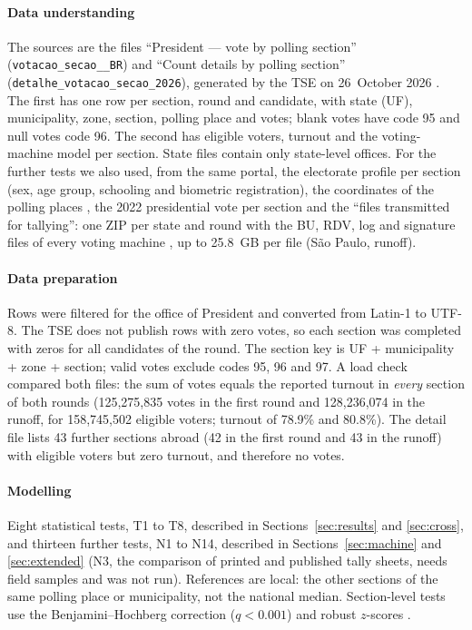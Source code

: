 \documentclass[fleqn,10pt]{SelfArx}
\begin{document}
\paragraph{Data understanding} The sources are the files ``President ---
vote by polling section'' (\texttt{votacao\_secao\_\_BR}) and ``Count
details by polling section'' (\texttt{detalhe\_votacao\_\allowbreak secao\_2026}),
generated by the TSE on 26~October 2026 \cite{tse2026}. The first has one
row per section, round and candidate, with state (UF), municipality, zone,
section, polling place and votes; blank votes have code 95 and null votes
code 96. The second has eligible voters, turnout and the voting-machine
model per section. State files contain only state-level offices. For the
further tests we also used, from the same portal, the electorate profile per
section (sex, age group, schooling and biometric registration), the
coordinates of the polling places \cite{tse2026eleitorado}, the 2022
presidential vote per section \cite{tse2022res} and the ``files transmitted
for tallying'': one ZIP per state and round with the
BU, RDV, log and signature files of every voting machine
\cite{tse2026urna}, up to 25.8~GB per file (S\~ao Paulo, runoff).

\paragraph{Data preparation} Rows were filtered for the office of President
and converted from Latin-1 to UTF-8. The TSE does not publish rows with zero
votes, so each section was completed with zeros for all candidates of the
round. The section key is UF + municipality + zone + section; valid votes
exclude codes 95, 96 and 97. A load check compared both files: the sum of
votes equals the reported turnout in \emph{every} section of both rounds
(125,275,835 votes in the first round and 128,236,074 in the runoff, for
158,745,502 eligible voters; turnout of 78.9\% and 80.8\%). The detail file
lists 43 further sections abroad (42 in the first round and 43 in the
runoff) with eligible voters but zero turnout, and therefore no votes.

\paragraph{Modelling} Eight statistical tests, T1 to T8, described in
Sections~\ref{sec:results} and \ref{sec:cross}, and thirteen further tests,
N1 to N14, described in Sections~\ref{sec:machine} and \ref{sec:extended}
(N3, the comparison of printed and published tally sheets, needs field
samples and was not run). References are local: the
other sections of the same polling place or municipality, not the national
median. Section-level tests use the Benjamini--Hochberg correction
($q<0.001$) and robust $z$-scores \cite{leys2013}.
\end{document}

